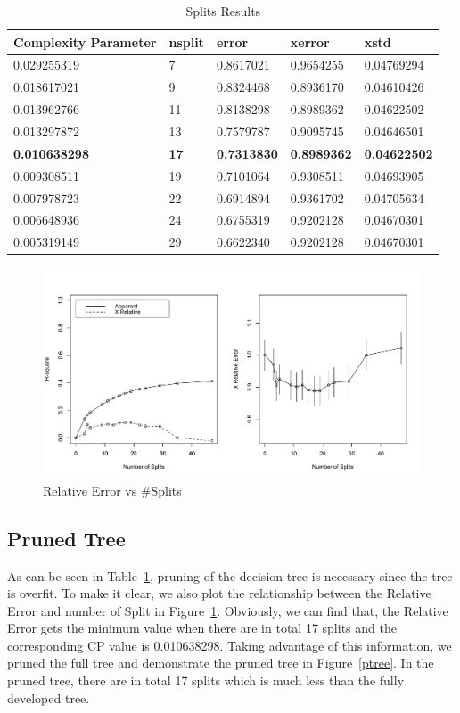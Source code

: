 \documentclass[letter]{article}
\begin{document}
\begin{table}[!htbp]
\centering
\caption{Splits Results}\label{split}
\begin{tabular}{lllll}
\hline
\hline
Complexity Parameter& nsplit & error & xerror & xstd \\
\hline
0.029255319   &   7& 0.8617021 &0.9654255 &0.04769294\\
0.018617021    &  9& 0.8324468 &0.8936170 &0.04610426\\
0.013962766 &     11& 0.8138298 &0.8989362 &0.04622502\\
0.013297872  &    13& 0.7579787 &0.9095745 &0.04646501\\
\textbf{0.010638298}  &   \textbf{17}& \textbf{0.7313830} &\textbf{0.8989362}
 &\textbf{0.04622502}\\
0.009308511  &   19& 0.7101064 &0.9308511 &0.04693905\\
0.007978723  &   22& 0.6914894 &0.9361702 &0.04705634\\
0.006648936  &   24& 0.6755319 &0.9202128 &0.04670301\\
0.005319149  &   29& 0.6622340 &0.9202128 &0.04670301\\
\hline
\hline
\end{tabular}
\end{table}

\begin{figure}[!tp]
\centering
\includegraphics[width=1\columnwidth]{fig/fit1-split}
\caption{Relative Error vs \#Splits}
\label{es}
\end{figure}

\subsection{Pruned Tree}
As can be seen in Table~\ref{split}, pruning of the decision tree is 
necessary since the tree is overfit. To make it clear, we also plot the
relationship between the Relative Error and number of Split in Figure~\ref{es}.
Obviously, we can find that, the Relative Error gets the minimum value when
there are in total 17 splits and the corresponding CP value is 0.010638298.
Taking advantage of this information, we pruned the full tree and demonstrate
the pruned tree in Figure~\ref{ptree}. In the pruned tree, there are in
total 17 splits which is much less than the fully developed tree.
\end{document}
